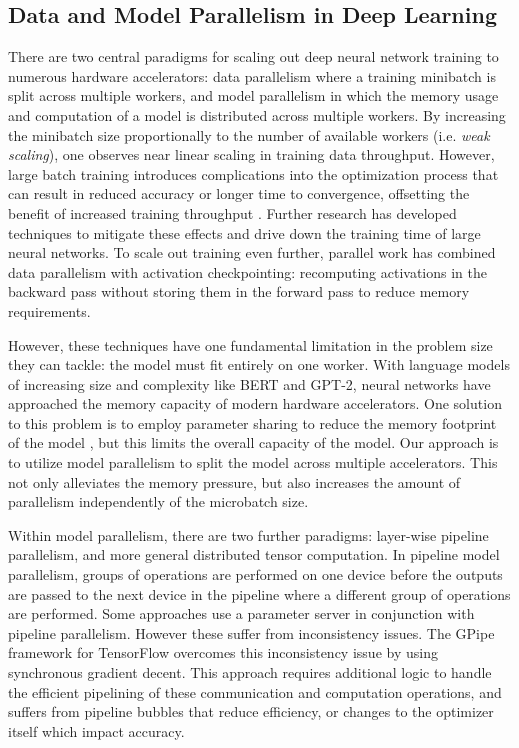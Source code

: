 \subsection{Data and Model Parallelism in Deep Learning} 

There are two central paradigms for scaling out deep neural network training to numerous hardware accelerators: data parallelism \cite{DataParallel1990} where a training minibatch is split across multiple workers, and model parallelism in which the memory usage and computation of a model is distributed across multiple workers. By increasing the minibatch size proportionally to the number of available workers (i.e. \emph{weak scaling}), one observes near linear scaling in training data throughput. However, large batch training introduces complications into the optimization process that can result in reduced accuracy or longer time to convergence, offsetting the benefit of increased training throughput \cite{LargeBatch2016}. Further research \cite{Goyal2017, Lars2017, Lamb2019} has developed techniques to mitigate these effects and drive down the training time of large neural networks. To scale out training even further, parallel work \cite{activation_checkpointing} has combined data parallelism with activation checkpointing: recomputing activations in the backward pass without storing them in the forward pass to reduce memory requirements. 

However, these techniques have one fundamental limitation in the problem size they can tackle: the model must fit entirely on one worker. With language models of increasing size and complexity like BERT and GPT-2, neural networks have approached the memory capacity of modern hardware accelerators. One solution to this problem is to employ parameter sharing to reduce the memory footprint of the model \cite{ALBERT2019}, but this limits the overall capacity of the model. Our approach is to utilize model parallelism to split the model across multiple accelerators. This not only alleviates the memory pressure, but also increases the amount of parallelism independently of the microbatch size.

Within model parallelism, there are two further paradigms: layer-wise pipeline parallelism, and more general distributed tensor computation. In pipeline model parallelism, groups of operations are performed on one device before the outputs are passed to the next device in the pipeline where a different group of operations are performed. Some approaches \cite{PipeDream2018, DualPipe2018} use a parameter server \cite{ParamServer2014} in conjunction with pipeline parallelism. However these suffer from inconsistency issues. The GPipe framework for TensorFlow \cite{GPipe} overcomes this inconsistency issue by using synchronous gradient decent. This approach requires additional logic to handle the efficient pipelining of these communication and computation operations, and suffers from pipeline bubbles that reduce efficiency, or changes to the optimizer itself which impact accuracy.

